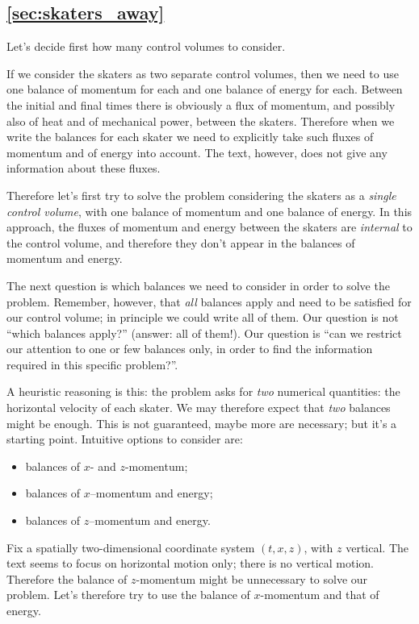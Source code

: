 \documentclass[a4paper,12pt,%
onecolumn,oneside,%
british%
]{memoir}
\newcommand{\solution}[1]{\subsection*{\makebox[0pt][r]{\faIcon[regular]{lightbulb}\enskip}\ref{#1}}%
\addcontentsline{toc}{subsection}{\ref{#1}}%
\label{#1_sol}%
\marginpar{\vspace{-1\baselineskip}\hspace{-8em}\footnotesize Exercise p.~\pageref{#1}}
}%
\renewcommand*{\|}[1][]{\nonscript\:#1\vert\nonscript\:\mathopen{}}
\begin{document}
\solution{sec:skaters_away}

Let's decide first how many control volumes to consider.

If we consider the skaters as two separate control volumes, then we need to use one balance of momentum for each and one balance of energy for each. Between the initial and final times there is obviously a flux of momentum, and possibly also of heat and of mechanical power, between the skaters. Therefore when we write the balances for each skater we need to explicitly take such fluxes of momentum and of energy into account. The text, however, does not give any information about these fluxes.

Therefore let's first try to solve the problem considering the skaters as a \emph{single control volume}, with one balance of momentum and one balance of energy. In this approach, the fluxes of momentum and energy between the skaters are \emph{internal} to the control volume, and therefore they don't appear in the balances of momentum and energy.

\smallskip

The next question is which balances we need to consider in order to solve the problem. Remember, however, that \emph{all} balances apply and need to be satisfied for our control volume; in principle we could write all of them. Our question is not \enquote{which balances apply?} (answer: all of them!). Our question is \enquote{can we restrict our attention to one or few balances only, in order to find the information required in this specific problem?}.

A heuristic reasoning is this: the problem asks for \emph{two} numerical quantities: the horizontal velocity of each skater. We may therefore expect that \emph{two} balances might be enough. This is not guaranteed, maybe more are necessary; but it's a starting point. Intuitive options to consider are:
\begin{itemize}[nosep]
\item balances of $x$- and $z$-momentum;
\item balances of $x$--momentum and energy;
\item balances of $z$--momentum and energy.
\end{itemize}
Fix a spatially two-dimensional coordinate system $(t, x, z)$, with $z$ vertical. The text seems to focus on horizontal motion only; there is no vertical motion. Therefore the balance of $z$-momentum might be unnecessary to solve our problem. Let's therefore try to use the balance of $x$-momentum and that of energy.
\end{document}
